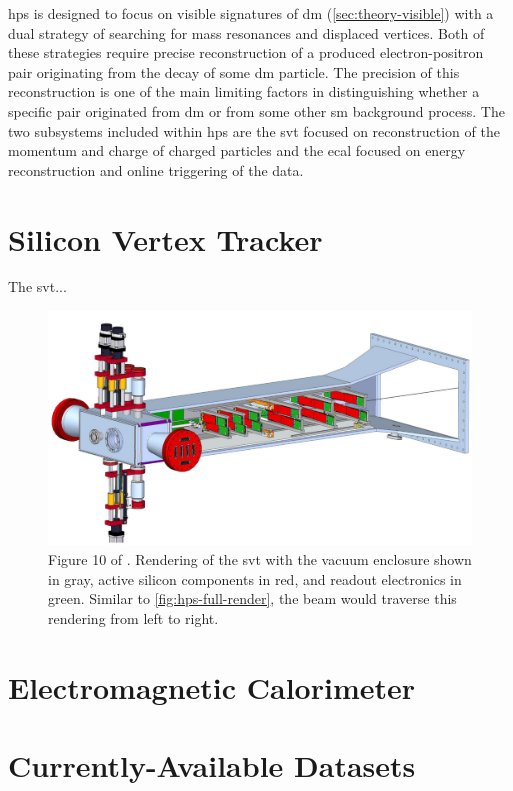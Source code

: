\ac{hps} is designed to focus on visible signatures of \ac{dm} (\cref{sec:theory-visible}) with
a dual strategy of searching for mass resonances and displaced vertices. Both of these strategies
require precise reconstruction of a produced electron-positron pair originating from the decay of
some \ac{dm} particle. The precision of this reconstruction is one of the main limiting factors
in distinguishing whether a specific pair originated from \ac{dm} or from some other \ac{sm}
background process. The two subsystems included within \ac{hps} are the \ac{svt} focused
on reconstruction of the momentum and charge of charged particles
and the \ac{ecal} focused on energy reconstruction and online triggering of the data.

\section{Silicon Vertex Tracker}
The \ac{svt}...

\begin{figure}
    \centering
    \includegraphics*[width=\textwidth]{figures/hps/experiment/smkcarty-thesis-fig-10-svt-render.png}
    \caption{
        Figure 10 of \cite{skmccarty-thesis-2020}. Rendering of the \ac{svt} with the vacuum
        enclosure shown in gray, active silicon components in red, and readout electronics in
        green. Similar to \cref{fig:hps-full-render}, the beam would traverse this rendering
        from left to right.
    }
    \label{fig:hps-svt-render}
\end{figure}

\section{Electromagnetic Calorimeter}

\section{Currently-Available Datasets}

